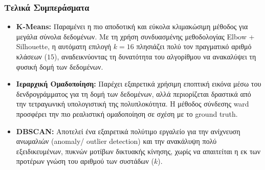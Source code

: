 \documentclass[11pt,a4paper]{article}
\newcommand{\eng}[1]{\textlatin{#1}}
\begin{document}
\subsubsection{Τελικά Συμπεράσματα}
\begin{itemize}
    \item \textbf{\eng{K-Means}:} Παραμένει η πιο αποδοτική και εύκολα κλιμακώσιμη μέθοδος για μεγάλα σύνολα δεδομένων. Με τη χρήση συνδυασμένης μεθοδολογίας \eng{Elbow} + \eng{Silhouette}, η αυτόματη επιλογή $k=16$ πλησιάζει πολύ τον πραγματικό αριθμό κλάσεων ($15$), αναδεικνύοντας τη δυνατότητα του αλγορίθμου να ανακαλύψει τη φυσική δομή των δεδομένων.
    \item \textbf{Ιεραρχική Ομαδοποίηση:} Παρέχει εξαιρετικά χρήσιμη εποπτική εικόνα μέσω του δενδρογράμματος για τη δομή των δεδομένων, αλλά περιορίζεται δραστικά από την τετραγωνική υπολογιστική της πολυπλοκότητα. Η μέθοδος σύνδεσης \eng{ward} προσφέρει την πιο ρεαλιστική ομαδοποίηση σε σχέση με το \eng{ground truth}.
    \item \textbf{\eng{DBSCAN}:} Αποτελεί ένα εξαιρετικά πολύτιμο εργαλείο για την ανίχνευση ανωμαλιών (\eng{anomaly/ outlier detection}) και την ανακάλυψη πολύ εξειδικευμένων, πυκνών μοτίβων δικτυακής κίνησης, χωρίς να απαιτείται η εκ των προτέρων γνώση του αριθμού των συστάδων ($k$).
\end{itemize}

\newpage
\end{document}
